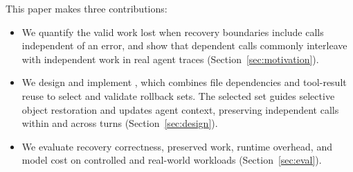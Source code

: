 This paper makes three contributions:
\begin{itemize}
  \item We quantify the valid work lost when recovery boundaries include
        calls independent of an error, and show that dependent calls
        commonly interleave with independent work in real agent traces
        (Section~\ref{sec:motivation}).
  \item We design and implement \system, which combines file dependencies
        and tool-result reuse to select and validate rollback sets. The
        selected set guides selective object restoration and updates
        agent context, preserving independent calls within and across turns
        (Section~\ref{sec:design}).
  \item We evaluate recovery correctness, preserved work, runtime overhead,
        and model cost on controlled and real-world workloads
        (Section~\ref{sec:eval}).
\end{itemize}
